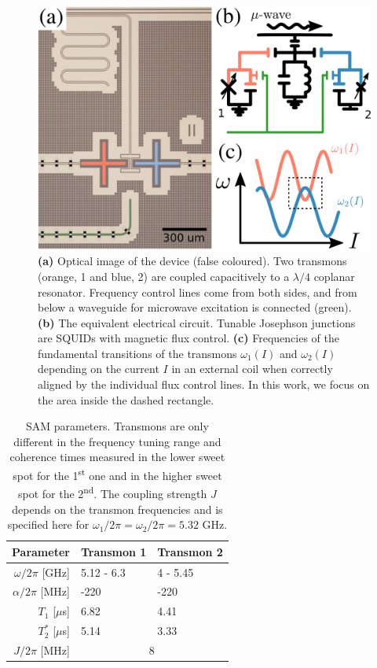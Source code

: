 \documentclass[%
 aps, prx,
 amsmath,amssymb,
 reprint,%
superscriptaddress
]{revtex4-2}
\begin{document}
\begin{figure}
	 	\includegraphics[width=\linewidth]{experiment_2}
	\caption{\textbf{(a)} Optical image of 
	the device (false coloured). Two transmons 
	(orange, 1 and blue, 2) are coupled 
	capacitively to a $\lambda/4$ coplanar 
	resonator. Frequency control lines come from 
	both sides, and from below a waveguide for 
	microwave excitation  is connected (green). 
	\textbf{(b)} The equivalent electrical 
	circuit. Tunable Josephson junctions are 
	SQUIDs with magnetic flux control. 
	\textbf{(c)} Frequencies of the fundamental 
	transitions of the transmons $\omega_1(I)$ 
	and $\omega_2(I)$ depending on the current 
	$I$ in an external coil when correctly 
	aligned by the individual flux control lines. 
	In this work, we focus on the area inside the 
	dashed rectangle.}
	\label{fig:experiment}
\end{figure}


\begin{table}
	\begin{ruledtabular}
	\begin{tabular}{rll}
	Parameter & Transmon 1  & Transmon 2\\\hline
	$\omega/2\pi$ [GHz] & 5.12 - 6.3  & 4 - 5.45\\
	$\alpha/2\pi$ [MHz] & -220 & -220 \\
	$T_1$ [$\mu$s]  & 6.82 &  4.41 \\
	$T_2^*$ [$\mu$s]  & 5.14  &  3.33\\\hline
	$J/2\pi$ [MHz] &\multicolumn{2}{c}{8} 
	\end{tabular}
	\end{ruledtabular}
	\caption{SAM parameters. Transmons are only 
	different in the frequency tuning range and 
	coherence times measured in the lower sweet 
	spot for the 1\textsuperscript{st} one and in 
	the higher sweet spot for the 
	2\textsuperscript{nd}. The coupling strength 
	$J$ depends on the transmon frequencies and 
	is specified here for $\omega_1/2\pi = 
	\omega_2/2\pi = 5.32$ GHz.}
	\label{tab:parameters}
\end{table}
\end{document}
